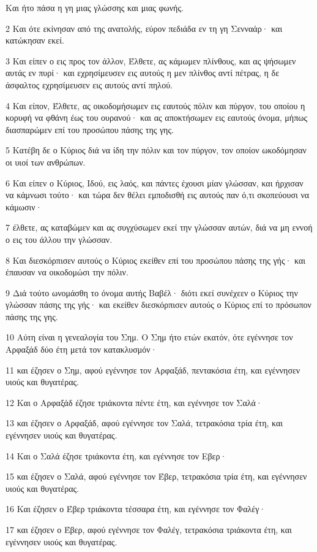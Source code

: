 \par Και ήτο πάσα η γη μιας γλώσσης και μιας φωνής.
\par 2 Και ότε εκίνησαν από της ανατολής, εύρον πεδιάδα εν τη γη Σενναάρ· και κατώκησαν εκεί.
\par 3 Και είπεν ο εις προς τον άλλον, Έλθετε, ας κάμωμεν πλίνθους, και ας ψήσωμεν αυτάς εν πυρί· και εχρησίμευσεν εις αυτούς η μεν πλίνθος αντί πέτρας, η δε άσφαλτος εχρησίμευσεν εις αυτούς αντί πηλού.
\par 4 Και είπον, Έλθετε, ας οικοδομήσωμεν εις εαυτούς πόλιν και πύργον, του οποίου η κορυφή να φθάνη έως του ουρανού· και ας αποκτήσωμεν εις εαυτούς όνομα, μήπως διασπαρώμεν επί του προσώπου πάσης της γης.
\par 5 Κατέβη δε ο Κύριος διά να ίδη την πόλιν και τον πύργον, τον οποίον ωκοδόμησαν οι υιοί των ανθρώπων.
\par 6 Και είπεν ο Κύριος, Ιδού, εις λαός, και πάντες έχουσι μίαν γλώσσαν, και ήρχισαν να κάμνωσι τούτο· και τώρα δεν θέλει εμποδισθή εις αυτούς παν ό,τι σκοπεύουσι να κάμωσιν·
\par 7 έλθετε, ας καταβώμεν και ας συγχύσωμεν εκεί την γλώσσαν αυτών, διά να μη εννοή ο εις του άλλου την γλώσσαν.
\par 8 Και διεσκόρπισεν αυτούς ο Κύριος εκείθεν επί του προσώπου πάσης της γής· και έπαυσαν να οικοδομώσι την πόλιν.
\par 9 Διά τούτο ωνομάσθη το όνομα αυτής Βαβέλ· διότι εκεί συνέχεεν ο Κύριος την γλώσσαν πάσης της γής· και εκείθεν διεσκόρπισεν αυτούς ο Κύριος επί το πρόσωπον πάσης της γης.
\par 10 Αύτη είναι η γενεαλογία του Σημ. Ο Σημ ήτο ετών εκατόν, ότε εγέννησε τον Αρφαξάδ δύο έτη μετά τον κατακλυσμόν·
\par 11 και έζησεν ο Σημ, αφού εγέννησε τον Αρφαξάδ, πεντακόσια έτη, και εγέννησεν υιούς και θυγατέρας.
\par 12 Και ο Αρφαξάδ έζησε τριάκοντα πέντε έτη, και εγέννησε τον Σαλά·
\par 13 και έζησεν ο Αρφαξάδ, αφού εγέννησε τον Σαλά, τετρακόσια τρία έτη, και εγέννησεν υιούς και θυγατέρας.
\par 14 Και ο Σαλά έζησε τριάκοντα έτη, και εγέννησε τον Εβερ·
\par 15 και έζησεν ο Σαλά, αφού εγέννησε τον Έβερ, τετρακόσια τρία έτη, και εγέννησεν υιούς και θυγατέρας.
\par 16 Και έζησεν ο Έβερ τριάκοντα τέσσαρα έτη, και εγέννησε τον Φαλέγ·
\par 17 και έζησεν ο Έβερ, αφού εγέννησε τον Φαλέγ, τετρακόσια τριάκοντα έτη, και εγέννησεν υιούς και θυγατέρας.
